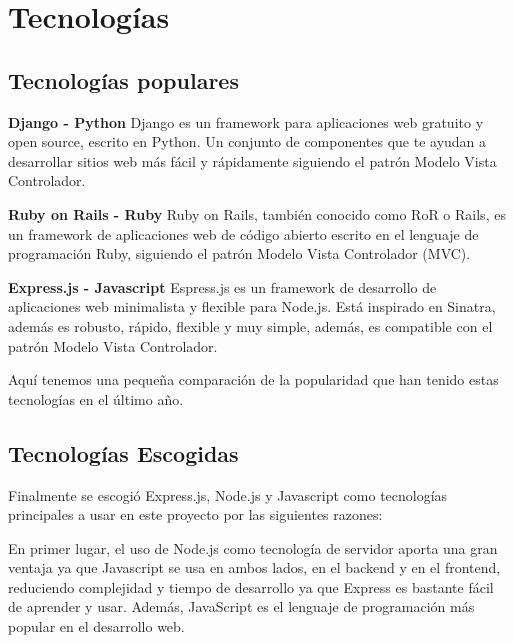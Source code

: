 
\section{Tecnologías}
\label{3:sec1}

\subsection{Tecnologías populares}
\label{3:1:1}
{\bf Django - Python}
Django es un framework para aplicaciones web gratuito y open source, escrito en Python. Un conjunto de componentes que te ayudan a desarrollar sitios web más fácil y rápidamente siguiendo el patrón Modelo Vista Controlador.

{\bf Ruby on Rails - Ruby}
Ruby on Rails, también conocido como RoR o Rails, es un framework de aplicaciones web de código abierto escrito en el lenguaje de programación Ruby, siguiendo el patrón Modelo Vista Controlador (MVC).

{\bf Express.js - Javascript}
Espress.js  es un framework de desarrollo de aplicaciones web minimalista y flexible para Node.js. Está inspirado en Sinatra, además es robusto, rápido, flexible y muy simple, además, es compatible con el patrón Modelo Vista Controlador.

Aquí tenemos una pequeña comparación de la popularidad que han tenido estas tecnologías en el último año.


\subsection{Tecnologías Escogidas}
\label{3:1:2}

Finalmente se escogió Express.js, Node.js y Javascript como tecnologías principales a usar en este proyecto por las siguientes razones:

En primer lugar, el uso de Node.js como tecnología de servidor aporta una gran ventaja ya que Javascript se usa en ambos lados, en el backend y en el frontend, reduciendo complejidad y tiempo de desarrollo ya que Express es bastante fácil de aprender y usar. Además, JavaScript es el lenguaje de programación más popular en el desarrollo web.

